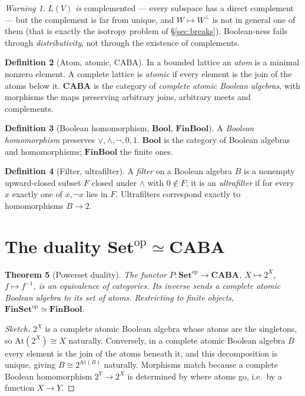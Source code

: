 \documentclass[11pt,a4paper]{article}
\newtheorem{theorem}{Theorem}[section]
\theoremstyle{definition}
\newtheorem{definition}[theorem]{Definition}
\theoremstyle{remark}
\newtheorem{warning}[theorem]{Warning}
\newcommand{\perpp}{^{\perp}}
\newcommand{\cat}[1]{\mathbf{#1}}
\newcommand{\Set}{\cat{Set}}
\newcommand{\FinSet}{\cat{FinSet}}
\newcommand{\Bool}{\cat{Bool}}
\newcommand{\FinBool}{\cat{FinBool}}
\newcommand{\CABA}{\cat{CABA}}
\newcommand{\op}{\mathrm{op}}
\begin{document}
\begin{warning}\label{warn:complemented}
$L(V)$ \emph{is} complemented --- every subspace has a direct complement --- but the
complement is far from unique, and $W \mapsto W\perpp$ is not in general one of them (that is
exactly the isotropy problem of \S\ref{sec:breaks}). Boolean-ness fails through
\emph{distributivity}, not through the existence of complements.
\end{warning}

\begin{definition}[Atom, atomic, CABA]
In a bounded lattice an \emph{atom} is a minimal nonzero element. A complete lattice is
\emph{atomic} if every element is the join of the atoms below it. $\CABA$ is the category of
\emph{complete atomic Boolean algebras}, with morphisms the maps preserving arbitrary joins,
arbitrary meets and complements.
\end{definition}

\begin{definition}[Boolean homomorphism, $\Bool$, $\FinBool$]
A \emph{Boolean homomorphism} preserves $\vee, \wedge, \neg, 0, 1$. $\Bool$ is the category of
Boolean algebras and homomorphisms; $\FinBool$ the finite ones.
\end{definition}

\begin{definition}[Filter, ultrafilter]
A \emph{filter} on a Boolean algebra $B$ is a nonempty upward-closed subset $F$ closed under
$\wedge$ with $0 \notin F$; it is an \emph{ultrafilter} if for every $x$ exactly one of
$x, \neg x$ lies in $F$. Ultrafilters correspond exactly to homomorphisms $B \to 2$.
\end{definition}

\section{The duality $\Set^{\op} \simeq \CABA$}

\begin{theorem}[Powerset duality]\label{thm:setcaba}
The functor $P : \Set^{\op} \to \CABA$, $X \mapsto 2^{X}$, $f \mapsto f^{-1}$, is an
equivalence of categories. Its inverse sends a complete atomic Boolean algebra to its set of
atoms. Restricting to finite objects, $\FinSet^{\op} \simeq \FinBool$.
\end{theorem}

\begin{proof}[Sketch]
$2^{X}$ is a complete atomic Boolean algebra whose atoms are the singletons, so
$\mathrm{At}(2^{X}) \cong X$ naturally. Conversely, in a complete atomic Boolean algebra $B$
every element is the join of the atoms beneath it, and this decomposition is unique, giving
$B \cong 2^{\mathrm{At}(B)}$ naturally. Morphisms match because a complete Boolean
homomorphism $2^{Y} \to 2^{X}$ is determined by where atoms go, i.e.\ by a function
$X \to Y$.
\end{proof}
\end{document}
